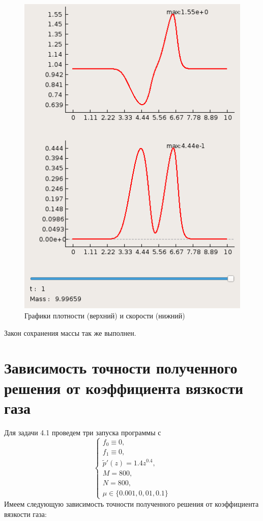 \documentclass[a4paper, 11pt]{article}
\begin{document}
\begin{figure}[H]
\begin{minipage}[h] {0.49\linewidth}
		\includegraphics[width=1\linewidth]{p2/p2_t=1.png}
	\end{minipage}
	\caption{Графики плотности (верхний) и скорости (нижний)}
\end{figure}
Закон сохранения массы так же выполнен.

\section{Зависимость точности полученного решения от коэффициента вязкости газа}
Для задачи 4.1 проведем три запуска программы с
$$
\begin{cases}
 f_0 \equiv  0, \\
 f_1  \equiv 0, \\
 \tilde{p}'(z) = 1.4z^{0.4}, \\
M = 800, \\
 N = 800, \\
 \mu \in \{0.001, 0,01, 0.1\}
\end{cases}
$$
Имеем следующую зависимость точности полученного решения от коэффициента вязкости газа:
\end{document}
